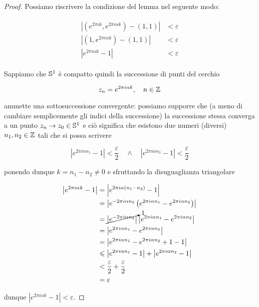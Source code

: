 \begin{proof}
	Possiamo riscrivere la condizione del lemma nel seguente modo:
	
	\begin{align}
		\begin{split}
			\left| (e^{2 \pi i k}, e^{2 \pi i \alpha k}) - (1,1) \right| &< \varepsilon \\
			\left| (1, e^{2 \pi i \alpha k}) - (1,1) \right| &< \varepsilon \\
			\left| e^{2 \pi i \alpha k} - 1 \right| &< \varepsilon
		\end{split}
	\end{align}

	Sappiamo che $ \S^{1} $ è compatto quindi la successione di punti del cerchio
	
	\begin{equation}
		z_{n} = e^{2 \pi i \alpha k} \qcomma n \in \Z
	\end{equation}

	ammette una sottosuccessione convergente: possiamo supporre che (a meno di cambiare semplicemente gli indici della successione) la successione stessa converga a un punto $ z_{n} \to z_{0} \in \S^{1} $ e ciò significa che esistono due numeri (diversi) $ n_{1},n_{2} \in \Z $ tali che si possa scrivere
	
	\begin{equation}
		\left| e^{2 \pi i \alpha n_{1}} - 1 \right| < \dfrac{\varepsilon}{2} %
		\quad \wedge \quad %
		\left| e^{2 \pi i \alpha n_{2}} - 1 \right| < \dfrac{\varepsilon}{2}
	\end{equation}

	ponendo dunque $ k = n_{1} - n_{2} \neq 0 $ e sfruttando la disuguaglianza triangolare
	
	\begin{align}
		\begin{split}
			\left| e^{2 \pi i \alpha k} - 1 \right| &= \left| e^{2 \pi i \alpha (n_{1} - n_{2})} - 1 \right| \\
			&= \left| e^{ -2 \pi i \alpha n_{2}} \left( e^{2 \pi i \alpha n_{1}} - e^{2 \pi i \alpha n_{2}} \right) \right| \\
			&= \cancelto{1}{ \left| e^{ -2 \pi i \alpha n_{2}} \right| } \left| e^{2 \pi i \alpha n_{1}} - e^{2 \pi i \alpha n_{2}} \right| \\
			&= \left| e^{2 \pi i \alpha n_{1}} - e^{2 \pi i \alpha n_{2}} \right| \\
			&= \left| e^{2 \pi i \alpha n_{1}} - e^{2 \pi i \alpha n_{2}} +1 -1 \right| \\
			&\leqslant \left| e^{2 \pi i \alpha n_{1}} - 1 \right| + \left| e^{2 \pi i \alpha n_{2}} - 1 \right| \\
			&< \dfrac{\varepsilon}{2} + \dfrac{\varepsilon}{2} \\
			&= \varepsilon
		\end{split}
	\end{align}

	dunque $ \left| e^{2 \pi i \alpha k} - 1 \right| < \varepsilon $.
\end{proof}


